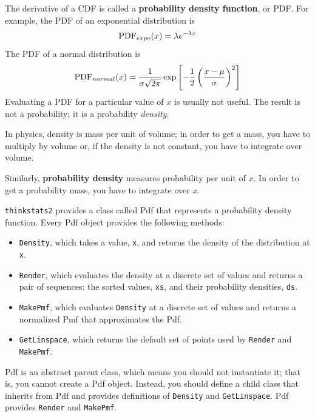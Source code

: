 \documentclass[12pt]{book}
\begin{document}
The derivative of a CDF is called a {\bf probability density function},
or PDF.  For example, the PDF of an exponential distribution is
%
\[ \mathrm{PDF}_{expo}(x) = \lambda e^{-\lambda x}   \]
%
The PDF of a normal distribution is
%
\[ \mathrm{PDF}_{normal}(x) = \frac{1}{\sigma \sqrt{2 \pi}} 
                 \exp \left[ -\frac{1}{2} 
                 \left( \frac{x - \mu}{\sigma} \right)^2 \right]  \]
%
Evaluating a PDF for a particular value of $x$ is usually not useful.
The result is not a probability; it is a probability {\em density}.

In physics, density is mass per unit of
volume; in order to get a mass, you have to multiply by volume or,
if the density is not constant, you have to integrate over volume.

Similarly, {\bf probability density} measures probability per unit of $x$.
In order to get a probability mass, you have to integrate over $x$.

\verb"thinkstats2" provides a class called Pdf that represents
a probability density function.  Every Pdf object provides the
following methods:

\begin{itemize}

\item \verb"Density", which takes a value, \verb"x", and returns the
  density of the distribution at \verb"x".

\item \verb"Render", which evaluates the density at a discrete set of
  values and returns a pair of sequences: the sorted values, \verb"xs",
  and their probability densities, \verb"ds".

\item \verb"MakePmf", which evaluates \verb"Density"
  at a discrete set of values and returns a normalized Pmf that
  approximates the Pdf.

\item \verb"GetLinspace", which returns the default set of points used 
  by \verb"Render" and \verb"MakePmf".

\end{itemize}  

Pdf is an abstract parent class, which means you should not
instantiate it; that is, you cannot create a Pdf object.  Instead, you
should define a child class that inherits from Pdf and provides
definitions of \verb"Density" and \verb"GetLinspace".  Pdf provides
\verb"Render" and \verb"MakePmf".
\end{document}
